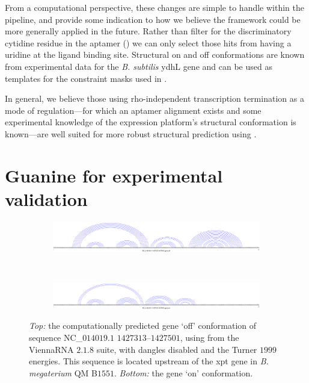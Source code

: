 From a computational perspective, these changes are simple to handle within the
\rfinder pipeline, and provide some indication to how we believe the framework
could be more generally applied in the future. Rather than filter for the
discriminatory cytidine residue in the \rb aptamer () we can only select those hits from \infernal having a uridine at the
ligand binding site. Structural on and off conformations are known from
experimental data for the {\em B. subtilis} ydhL gene \citep{mandal2004a} and can
be used as templates for the constraint masks used in .

In general, we believe those \rbs using rho-independent transcription
termination as a mode of regulation---for which an aptamer alignment exists and
some experimental knowledge of the expression platform's structural
conformation is known---are well suited for more robust structural
prediction using \rfinder.

\section{Guanine \rbs for experimental validation}
\label{sec:rfinder:grbValidationVarna}

\begin{figure}[!ht]
\centering
\begin{subfigure}[h]{\textwidth}
\centering
\includegraphics[width=.9\textwidth]{Figures/Ribofinder/NC_014019_1_1427313_1427501_OFF.pdf}
\end{subfigure} \\
\medskip
\begin{subfigure}[h]{\textwidth}
\centering
\includegraphics[width=.9\textwidth]{Figures/Ribofinder/NC_014019_1_1427313_1427501_ON.pdf}
\end{subfigure}
\caption[Structures for the putative \rb located upstream of the xpt gene in {\em B. megaterium} QM B$1551$]{{\em Top:} the computationally predicted gene `off' conformation of
sequence NC\_$014019.1$ $1427313$--$1427501$, using \rfold from the ViennaRNA $2.1.8$
suite, with dangles disabled and the Turner $1999$ energies. This sequence is
located upstream of the xpt gene in {\em B. megaterium} QM B$1551$. {\em Bottom:}
the gene `on' conformation.}
\label{fig:figure:NC_014019_1_1427313_1427501}
\end{figure}
\medskip

